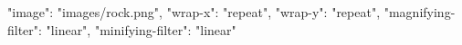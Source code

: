 {
  "image": "images/rock.png",
  "wrap-x": "repeat",
  "wrap-y": "repeat",
  "magnifying-filter": "linear",
  "minifying-filter": "linear"
}